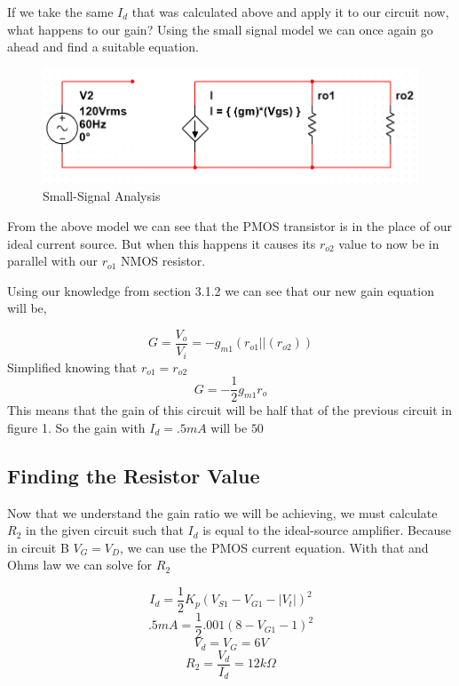 \documentclass[12pt]{article}
\begin{document}
If we take the same $I_d$ that was calculated above and apply it to our circuit now, what happens to our gain? Using the small signal model we can once again go ahead and find a suitable equation.

\begin{figure}[h]
	\label{fig:amp}
	\caption{Small-Signal Analysis}
	\centering
	\includegraphics[width=.5\textwidth]{smallsignal2}
\end{figure}

From the above model we can see that the PMOS transistor is in the place of our ideal current source. But when this happens it causes its $r_{o2}$ value to now be in parallel with our $r_{o1}$ NMOS resistor.

Using our knowledge from section 3.1.2 we can see that our new gain equation will be,

$$G = \frac{V_o}{V_i} = -g_{m1} (r_{o1}||(r_{o2}))$$
Simplified knowing that $r_{o1} = r_{o2}$
$$G = -\frac{1}{2}g_{m1}r_o$$
This means that the gain of this circuit will be half that of the previous circuit in figure 1. So the gain with $I_d = .5mA$ will be $50$

\subsection{Finding the Resistor Value}

Now that we understand the gain ratio we will be achieving, we must calculate $R_2$ in the given circuit such that $I_d$ is equal to the ideal-source amplifier. Because in circuit B $V_G = V_D$, we can use the PMOS current equation. With that and Ohms law we can solve for $R_2$

$$I_d = \frac{1}{2} K_p (V_{S1} - V_{G1}- |V_t| )^2$$
$$.5mA = \frac{1}{2} .001 (8-V_{G1} - 1)^2   $$
$$V_d = V_{G} = 6V$$
$$R_2 = \frac{V_d}{I_d} = 12k\Omega$$
\end{document}
